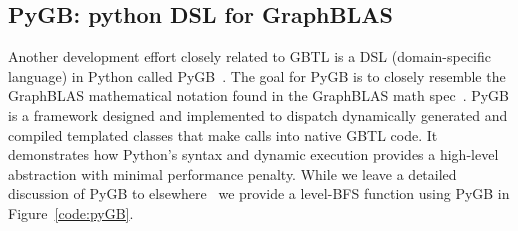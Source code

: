 \subsection{PyGB: python DSL for GraphBLAS}

Another development effort closely related to GBTL is a DSL (domain-specific language) in Python called PyGB~\cite{Chamberlin2016}.  
The goal for PyGB is to closely resemble the GraphBLAS mathematical notation found in the GraphBLAS math spec~\cite{mathgraphblas16}.  
PyGB is a framework designed and implemented to dispatch dynamically generated and compiled templated 
classes that make calls into native GBTL code.  It demonstrates how Python's syntax and dynamic execution provides 
a high-level abstraction with minimal performance penalty.  While we leave a detailed discussion of PyGB to elsewhere~\cite{Chamberlin2016}
we provide a level-BFS function using PyGB in Figure~\ref{code:pyGB}.

